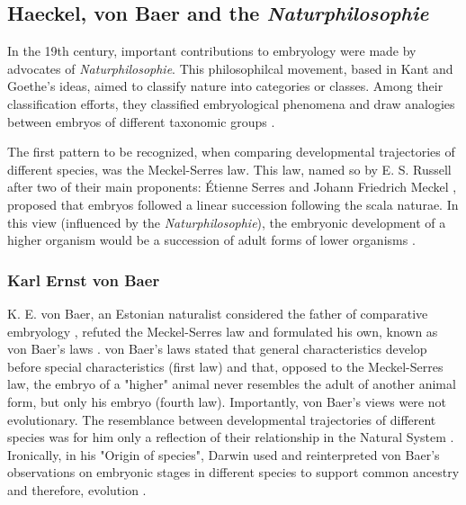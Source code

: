 \subsection{Haeckel, von Baer and the \textit{Naturphilosophie}}
In the 19th century, important contributions to embryology were made by advocates of \textit{Naturphilosophie}.
This philosophilcal movement, based in Kant and Goethe's ideas, aimed to classify nature into categories or classes. Among their classification efforts, they classified embryological phenomena and draw analogies between embryos of different taxonomic groups  \citep{Horder2010,Ghiselin2005}.

The first pattern to be recognized, when comparing developmental trajectories of different species, was the Meckel-Serres law. 
This law, named so by E. S. Russell after two of their main proponents: \'{E}tienne Serres and Johann Friedrich Meckel \citep{Russell1916}, proposed that embryos followed a linear succession following the scala naturae.
In this view (influenced by the \textit{Naturphilosophie}), the embryonic development of a higher organism would be a succession of adult forms of lower organisms \citep{Russell1916,amundson2005changing}.

\subsubsection{Karl Ernst von Baer} \label{vonBaer}
K. E. von Baer, an Estonian naturalist considered the father of comparative embryology \citep{Russell1916}, refuted the Meckel-Serres law and formulated his own, known as von Baer's laws \citep{vonBaer1828uber}. 
von Baer's laws stated that general characteristics develop before special characteristics (first law) and that, opposed to the Meckel-Serres law, the embryo of a "higher" animal never resembles the adult of another animal form, but only his embryo (fourth law). 
Importantly, von Baer's views were not evolutionary. The resemblance between developmental trajectories of different species was for him only a reflection of their relationship in the Natural System \citep{amundson2005changing}.
Ironically, in his "Origin of species", Darwin used and reinterpreted von Baer's observations on embryonic stages in different species to support common ancestry and therefore, evolution \citep{darwin1859origin}.

